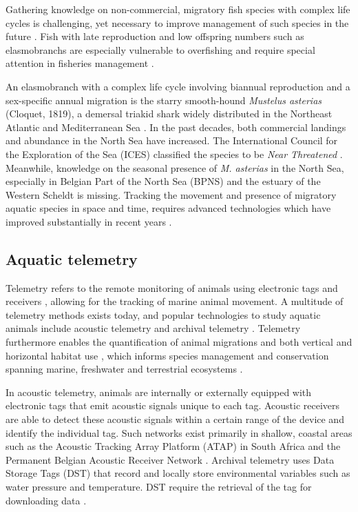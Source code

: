 \documentclass[
  authoryear,
  review,
  3p]{elsarticle}
\begin{document}
Gathering knowledge on non-commercial, migratory fish species with
complex life cycles is challenging, yet necessary to improve management
of such species in the future \citep{brownscombe_2022}. Fish with late
reproduction and low offspring numbers such as elasmobranchs are
especially vulnerable to overfishing and require special attention in
fisheries management \citep{stevens_2000}.

An elasmobranch with a complex life cycle involving biannual
reproduction and a sex-specific annual migration is the starry
smooth-hound \emph{Mustelus asterias} (Cloquet, 1819), a demersal
triakid shark widely distributed in the Northeast Atlantic and
Mediterranean Sea \citep{breve_2016, griffiths_2020}. In the past
decades, both commercial landings
\citep{ices_2022, bitonporsmoguer_2022} and abundance in the North Sea
\citep{mccullyphillips_2015} have increased. The International Council
for the Exploration of the Sea (ICES) classified the species to be
\emph{Near Threatened} \citep{ices_2022}. Meanwhile, knowledge on the
seasonal presence of \emph{M. asterias} in the North Sea, especially in
Belgian Part of the North Sea (BPNS) and the estuary of the Western
Scheldt is missing. Tracking the movement and presence of migratory
aquatic species in space and time, requires advanced technologies which
have improved substantially in recent years \citep{whoriskey_2019}.

\hypertarget{aquatic-telemetry}{%
\subsection{Aquatic telemetry}\label{aquatic-telemetry}}

Telemetry refers to the remote monitoring of animals using electronic
tags and receivers \citep{whoriskey_2019}, allowing for the tracking of
marine animal movement. A multitude of telemetry methods exists today,
and popular technologies to study aquatic animals include acoustic
telemetry and archival telemetry \citep{thorstad_2013}. Telemetry
furthermore enables the quantification of animal migrations and both
vertical and horizontal habitat use \citep{hussey_2015}, which informs
species management and conservation spanning marine, freshwater and
terrestrial ecosystems \citep{beger_2010}.

In acoustic telemetry, animals are internally or externally equipped
with electronic tags that emit acoustic signals unique to each tag.
Acoustic receivers are able to detect these acoustic signals within a
certain range of the device and identify the individual tag. Such
networks exist primarily in shallow, coastal areas \citep{hussey_2015}
such as the Acoustic Tracking Array Platform (ATAP) in South Africa
\citep{cowley_2017} and the Permanent Belgian Acoustic Receiver Network
\citep[PBARN,][]{reubens_2019}. Archival telemetry uses Data Storage
Tags (DST) that record and locally store environmental variables such as
water pressure and temperature. DST require the retrieval of the tag for
downloading data \citep{thorstad_2013}.
\end{document}
